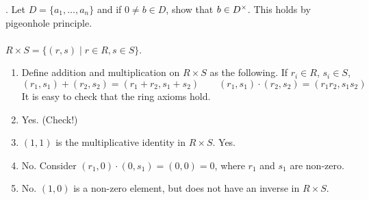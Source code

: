 \pf. Let $D = \{a_1, \dots, a_n\}$ and if $0\neq b\in D$, show that $b\in D^\times$. This holds by pigeonhole principle.\\
\\
 $R\times S = \{(r, s) \mid r\in R, s\in S\}$.
\begin{enumerate} 
	\item Define addition and multiplication on $R\times S$ as the following. If $r_i \in R$, $s_i\in S$,
	$$(r_1, s_1) + (r_2, s_2) = (r_1+r_2, s_1+s_2) \qquad (r_1, s_1)\cdot (r_2, s_2) = (r_1r_2, s_1s_2)$$
	It is easy to check that the ring axioms hold.
	\item Yes. (Check!)
	\item $(1, 1)$ is the multiplicative identity in $R\times S$. Yes.
	\item No. Consider $(r_1, 0)\cdot (0, s_1) = (0, 0) = 0$, where $r_1$ and $s_1$ are non-zero.
	\item No. $(1, 0)$ is a non-zero element, but does not have an inverse in $R\times S$.
\end{enumerate}

\pagebreak